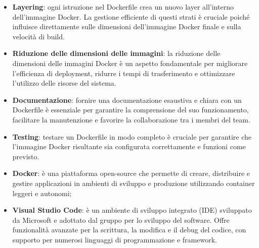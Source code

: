 \begin{itemize}
	\item \textbf{Layering}: ogni istruzione nel Dockerfile crea un nuovo layer all'interno dell'immagine Docker. La gestione efficiente di questi strati è cruciale poiché influisce direttamente sulle dimensioni dell'immagine Docker finale e sulla velocità di build.
	\item \textbf{Riduzione delle dimensioni delle immagini}: la riduzione delle dimensioni delle immagini Docker è un aspetto fondamentale per migliorare l'efficienza di deployment, ridurre i tempi di trasferimento e ottimizzare l'utilizzo delle risorse del sistema.
	\item \textbf{Documentazione}: fornire una documentazione esaustiva e chiara con un Dockerfile è essenziale per garantire la comprensione del suo funzionamento, facilitare la manutenzione e favorire la collaborazione tra i membri del team.
	\item \textbf{Testing}: testare un Dockerfile in modo completo è cruciale per garantire che l'immagine Docker risultante sia configurata correttamente e funzioni come previsto.
\end{itemize}

\begin{itemize}
	\item \textbf{Docker}: è una piattaforma open-source che permette di creare, distribuire e gestire applicazioni in ambienti di sviluppo e produzione utilizzando container leggeri e autonomi;
	\item \textbf{Visual Studio Code}: è un ambiente di sviluppo integrato (IDE) sviluppato da Microsoft e adottato dal gruppo per lo sviluppo del software. Offre funzionalità avanzate per la scrittura, la modifica e il debug del codice, con supporto per numerosi linguaggi di programmazione e framework.
\end{itemize}
